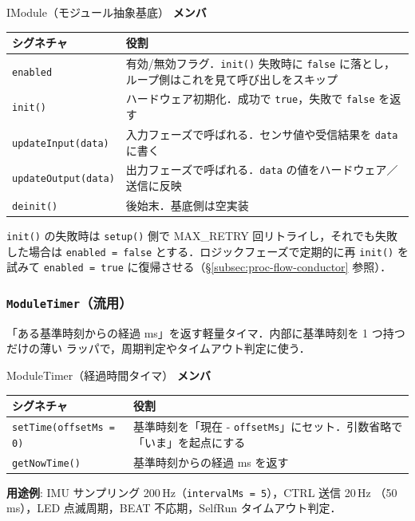 \documentclass[lualatex,book,paper=a4paper,jafontsize=11.5pt,jafontscale=1.05]{jlreq}
\begin{document}
\begin{apibox}{IModule（モジュール抽象基底）}
\textbf{メンバ}\\[2pt]
\begin{tabular}{l p{}}
\toprule
\textbf{シグネチャ} & \textbf{役割} \\
\midrule
\texttt{enabled}              & 有効/無効フラグ．\texttt{init()} 失敗時に \texttt{false} に落とし，ループ側はこれを見て呼び出しをスキップ \\
\texttt{init()}               & ハードウェア初期化．成功で \texttt{true}，失敗で \texttt{false} を返す \\
\texttt{updateInput(data)}    & 入力フェーズで呼ばれる．センサ値や受信結果を \texttt{data} に書く \\
\texttt{updateOutput(data)}   & 出力フェーズで呼ばれる．\texttt{data} の値をハードウェア／送信に反映 \\
\texttt{deinit()}             & 後始末．基底側は空実装 \\
\bottomrule
\end{tabular}
\end{apibox}

\texttt{init()} の失敗時は \texttt{setup()} 側で MAX\_RETRY 回リトライし，それでも失敗
した場合は \texttt{enabled = false} とする．ロジックフェーズで定期的に再 \texttt{init()}
を試みて \texttt{enabled = true} に復帰させる（\S\ref{subsec:proc-flow-conductor} 参照）．

\subsubsection{\texttt{ModuleTimer}（流用）}

「ある基準時刻からの経過 ms」を返す軽量タイマ．内部に基準時刻を 1 つ持つだけの薄い
ラッパで，周期判定やタイムアウト判定に使う．

\begin{apibox}{ModuleTimer（経過時間タイマ）}
\textbf{メンバ}\\[2pt]
\begin{tabular}{l p{}}
\toprule
\textbf{シグネチャ} & \textbf{役割} \\
\midrule
\texttt{setTime(offsetMs = 0)} & 基準時刻を「現在 - \texttt{offsetMs}」にセット．引数省略で「いま」を起点にする \\
\texttt{getNowTime()}          & 基準時刻からの経過 ms を返す \\
\bottomrule
\end{tabular}

\medskip
\textbf{用途例}: IMU サンプリング 200\,Hz（\texttt{intervalMs = 5}），CTRL 送信 20\,Hz
（50\,ms），LED 点滅周期，BEAT 不応期，SelfRun タイムアウト判定．
\end{apibox}
\end{document}
